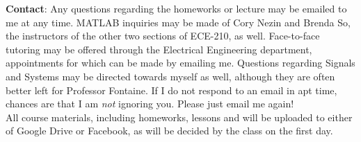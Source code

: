 \documentclass{article}
\begin{document}
\textbf{Contact}: Any questions regarding the homeworks or lecture may be emailed to me at any time. MATLAB inquiries may be made of Cory Nezin and Brenda So, the instructors of the other two sections of ECE-210, as well. Face-to-face tutoring may be offered through the Electrical Engineering department, appointments for which can be made by emailing me. Questions regarding Signals and Systems may be directed towards myself as well, although they are often better left for Professor Fontaine. If I do not respond to an email in apt time, chances are that I am \textit{not} ignoring you. Please just email me again! \\
All course materials, including homeworks, lessons and  will be uploaded to either of Google Drive or Facebook, as will be decided by the class on the first day.
\end{document}
